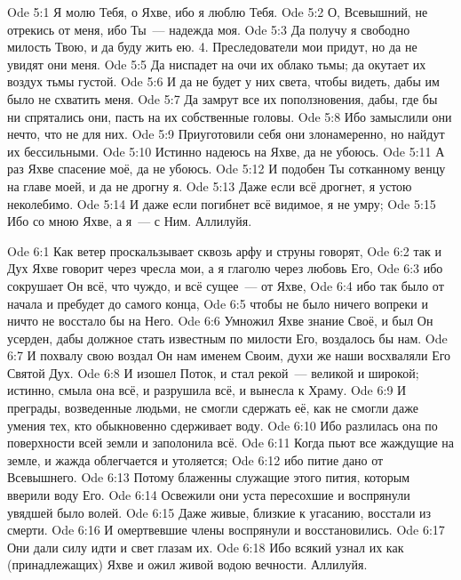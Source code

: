 \vs Ode 5:1
Я молю Тебя,
о Яхве, ибо я люблю Тебя.
\vs Ode 5:2
О,
Всевышний, не отрекись от меня, ибо Ты~--- надежда моя.
\vs Ode 5:3
Да получу я
свободно милость Твою, и да буду жить ею.
4.
Преследователи мои придут, но да не увидят они меня.
\vs Ode 5:5
Да ниспадет
на очи их облако тьмы; да окутает их воздух тьмы густой.
\vs Ode 5:6
И да не
будет у них света, чтобы видеть, дабы им было не схватить меня.
\vs Ode 5:7
Да замрут
все их поползновения, дабы, где бы ни спрятались они, пасть на их собственные
головы.
\vs Ode 5:8
Ибо
замыслили они нечто, что не для них.
\vs Ode 5:9
Приуготовили
себя они злонамеренно, но найдут их бессильными.
\vs Ode 5:10
Истинно
надеюсь на Яхве, да не убоюсь.
\vs Ode 5:11
А раз Яхве спасение моё, да не убоюсь.
\vs Ode 5:12
И подобен
Ты сотканному венцу на главе моей, и да не дрогну я.
\vs Ode 5:13
Даже если
всё дрогнет, я устою неколебимо.
\vs Ode 5:14
И даже если
погибнет всё видимое, я не умру;
\vs Ode 5:15
Ибо со мною
Яхве, а я~--- с Ним.
Аллилуйя.

\vs Ode 6:1
Как ветер
проскальзывает сквозь арфу и струны говорят,
\vs Ode 6:2
так и Дух Яхве
говорит через чресла мои, а я глаголю через любовь Его,
\vs Ode 6:3
ибо сокрушает
Он всё, что чуждо, и всё сущее~--- от Яхве,
\vs Ode 6:4
ибо так было
от начала и пребудет до самого конца,
\vs Ode 6:5
чтобы не было
ничего вопреки и ничто не восстало бы на Него.
\vs Ode 6:6
Умножил Яхве
знание Своё, и был Он усерден, дабы должное стать известным по милости Его,
воздалось бы нам.
\vs Ode 6:7
И похвалу свою
воздал Он нам именем Своим, духи же наши восхваляли Его Святой Дух.
\vs Ode 6:8
И изошел
Поток, и стал рекой~--- великой и широкой; истинно, смыла она всё, и разрушила
всё, и вынесла к Храму.
\vs Ode 6:9
И преграды,
возведенные людьми, не смогли сдержать её, как не смогли даже умения тех, кто
обыкновенно сдерживает воду.
\vs Ode 6:10
Ибо разлилась
она по поверхности всей земли и заполонила всё.
\vs Ode 6:11
Когда пьют
все жаждущие на земле, и жажда облегчается и утоляется;
\vs Ode 6:12
ибо питие
дано от Всевышнего.
\vs Ode 6:13
Потому
блаженны служащие этого пития, которым вверили воду Его.
\vs Ode 6:14
Освежили они
уста пересохшие и воспрянули увядшей было волей.
\vs Ode 6:15
Даже живые,
близкие к угасанию, восстали из смерти.
\vs Ode 6:16
И омертвевшие
члены воспрянули и восстановились.
\vs Ode 6:17
Они дали силу
идти и свет глазам их.
\vs Ode 6:18
Ибо всякий
узнал их как (принадлежащих) Яхве и ожил живой водою вечности.
Аллилуйя.

